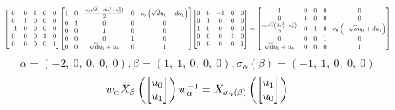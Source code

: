 \documentclass[11pt]{article}
\theoremstyle{definition}
\begin{document}
\[
\scaletoalign{\textwidth}{{\left[\begin{matrix}0 & 0 & 1 & 0 & 0\\0 & 1 & 0 & 0 & 0\\-1 & 0 & 0 & 0 & 0\\0 & 0 & 0 & 1 & 0\\0 & 0 & 0 & 0 & 1\end{matrix}\right]} {\left[\begin{matrix}1 & 0 & \frac{c_{0} \sqrt{d} \left(- d u_{1}^{2} + u_{0}^{2}\right)}{2} & 0 & c_{0} \left(\sqrt{d} u_{0} - d u_{1}\right)\\0 & 1 & 0 & 0 & 0\\0 & 0 & 1 & 0 & 0\\0 & 0 & 0 & 1 & 0\\0 & 0 & \sqrt{d} u_{1} + u_{0} & 0 & 1\end{matrix}\right]} {\left[\begin{matrix}0 & 0 & -1 & 0 & 0\\0 & 1 & 0 & 0 & 0\\1 & 0 & 0 & 0 & 0\\0 & 0 & 0 & 1 & 0\\0 & 0 & 0 & 0 & 1\end{matrix}\right]} = {\left[\begin{matrix}1 & 0 & 0 & 0 & 0\\0 & 1 & 0 & 0 & 0\\\frac{c_{0} \sqrt{d} \left(d u_{1}^{2} - u_{0}^{2}\right)}{2} & 0 & 1 & 0 & c_{0} \left(- \sqrt{d} u_{0} + d u_{1}\right)\\0 & 0 & 0 & 1 & 0\\\sqrt{d} u_{1} + u_{0} & 0 & 0 & 0 & 1\end{matrix}\right]}}
\]
\[
\alpha = \left( -2, \  0, \  0, \  0, \  0\right), \beta = \left( 1, \  1, \  0, \  0, \  0\right), \sigma_{\alpha}(\beta) = \left( -1, \  1, \  0, \  0, \  0\right)
\]
\[
\scaletoalign{\textwidth}{w_{\alpha} X_{\beta}\left(\left[\begin{matrix}u_{0}\\u_{1}\end{matrix}\right]\right) w_{\alpha}^{-1} = X_{\sigma_{\alpha}\left(\beta\right)}\left(\left[\begin{matrix}u_{1}\\u_{0}\end{matrix}\right]\right)}
\]
\end{document}
